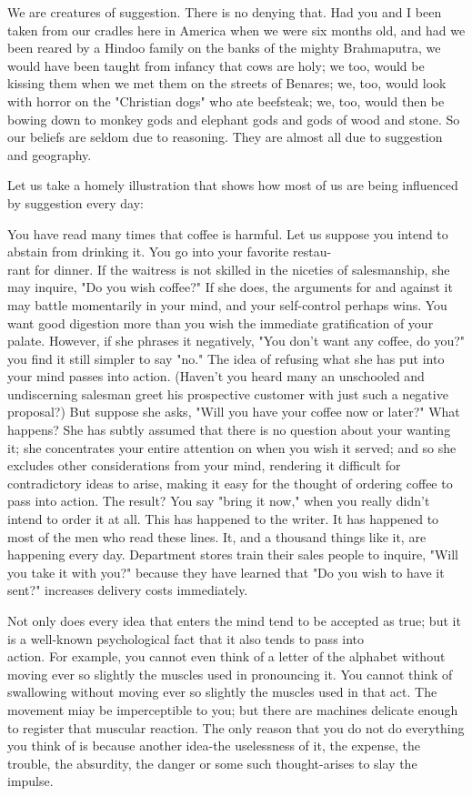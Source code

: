 \documentclass[10pt]{article}
\begin{document}
We are creatures of suggestion. There is no denying that. Had you and I been taken from our cradles here in America when we were six months old, and had we been reared by a Hindoo family on the banks of the mighty Brahmaputra, we would have been taught from infancy that cows are holy; we too, would be kissing them when we met them on the streets of Benares; we, too, would look with horror on the "Christian dogs" who ate beefsteak; we, too, would then be bowing down to monkey gods and elephant gods and gods of wood and stone. So our beliefs are seldom due to reasoning. They are almost all due to suggestion and geography.

Let us take a homely illustration that shows how most of us are being influenced by suggestion every day:

You have read many times that coffee is harmful. Let us suppose you intend to abstain from drinking it. You go into your favorite restau-\\
rant for dinner. If the waitress is not skilled in the niceties of salesmanship, she may inquire, "Do you wish coffee?" If she does, the arguments for and against it may battle momentarily in your mind, and your self-control perhaps wins. You want good digestion more than you wish the immediate gratification of your palate. However, if she phrases it negatively, "You don't want any coffee, do you?" you find it still simpler to say "no." The idea of refusing what she has put into your mind passes into action. (Haven't you heard many an unschooled and undiscerning salesman greet his prospective customer with just such a negative proposal?) But suppose she asks, "Will you have your coffee now or later?" What happens? She has subtly assumed that there is no question about your wanting it; she concentrates your entire attention on when you wish it served; and so she excludes other considerations from your mind, rendering it difficult for contradictory ideas to arise, making it easy for the thought of ordering coffee to pass into action. The result? You say "bring it now," when you really didn't intend to order it at all. This has happened to the writer. It has happened to most of the men who read these lines. It, and a thousand things like it, are happening every day. Department stores train their sales people to inquire, "Will you take it with you?" because they have learned that "Do you wish to have it sent?" increases delivery costs immediately.

Not only does every idea that enters the mind tend to be accepted as true; but it is a well-known psychological fact that it also tends to pass into\\
action. For example, you cannot even think of a letter of the alphabet without moving ever so slightly the muscles used in pronouncing it. You cannot think of swallowing without moving ever so slightly the muscles used in that act. The movement miay be imperceptible to you; but there are machines delicate enough to register that muscular reaction. The only reason that you do not do everything you think of is because another idea-the uselessness of it, the expense, the trouble, the absurdity, the danger or some such thought-arises to slay the impulse.
\end{document}

